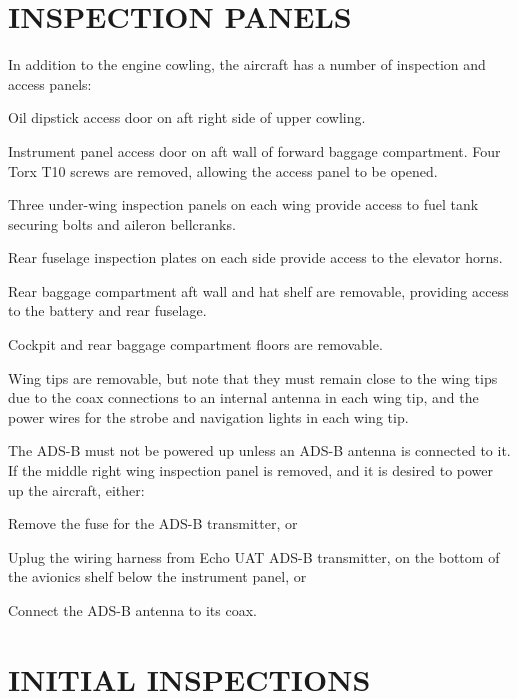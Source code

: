 \section{INSPECTION PANELS}
In addition to the engine cowling, the aircraft has a number of inspection and access panels:
\begin{enumerate*}
  \item Oil dipstick access door on aft right side of upper cowling.
  \item Instrument panel access door on aft wall of forward baggage compartment. Four Torx T10 screws are removed, allowing the access panel to be opened.
  \item Three under-wing inspection panels on each wing provide access to fuel tank securing bolts and aileron bellcranks.
  \item Rear fuselage inspection plates on each side provide access to the elevator horns.
  \item Rear baggage compartment aft wall and hat shelf are removable, providing access to the battery and rear fuselage.
  \item Cockpit and rear baggage compartment floors are removable.
  \item Wing tips are removable, but note that they must remain close to the wing tips due to the coax connections to an internal antenna in each wing tip, and the power wires for the strobe and navigation lights in each wing tip.
  \end{enumerate*}

\begin{Note}[CAUTION]
The ADS-B must not be powered up unless an ADS-B antenna is connected to it.  If the middle right wing inspection panel is removed, and it is desired to power up the aircraft, either:
\begin{enumerate*}
	\item Remove the fuse for the ADS-B transmitter, or
	\item Uplug the wiring harness from Echo UAT ADS-B transmitter, on the bottom of the avionics shelf below the instrument panel, or
	\item Connect the ADS-B antenna to its coax.
\end{enumerate*}
\end{Note}

\section{INITIAL INSPECTIONS}

